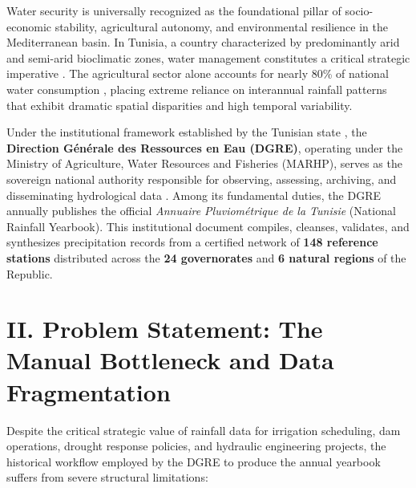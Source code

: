 \documentclass[12pt,a4paper]{report}
\begin{document}
Water security is universally recognized as the foundational pillar of socio-economic stability, agricultural autonomy, and environmental resilience in the Mediterranean basin. In Tunisia, a country characterized by predominantly arid and semi-arid bioclimatic zones, water management constitutes a critical strategic imperative \cite{fao2022, elgourari2024}. The agricultural sector alone accounts for nearly 80\% of national water consumption \cite{onagri2023}, placing extreme reliance on interannual rainfall patterns that exhibit dramatic spatial disparities and high temporal variability.

Under the institutional framework established by the Tunisian state \cite{jort2001}, the \textbf{Direction Générale des Ressources en Eau (DGRE)}, operating under the Ministry of Agriculture, Water Resources and Fisheries (MARHP), serves as the sovereign national authority responsible for observing, assessing, archiving, and disseminating hydrological data \cite{dgre2023}. Among its fundamental duties, the DGRE annually publishes the official \textit{Annuaire Pluviométrique de la Tunisie} (National Rainfall Yearbook). This institutional document compiles, cleanses, validates, and synthesizes precipitation records from a certified network of \textbf{148 reference stations} distributed across the \textbf{24 governorates} and \textbf{6 natural regions} of the Republic.

\section*{II. Problem Statement: The Manual Bottleneck and Data Fragmentation}

Despite the critical strategic value of rainfall data for irrigation scheduling, dam operations, drought response policies, and hydraulic engineering projects, the historical workflow employed by the DGRE to produce the annual yearbook suffers from severe structural limitations:
\end{document}
